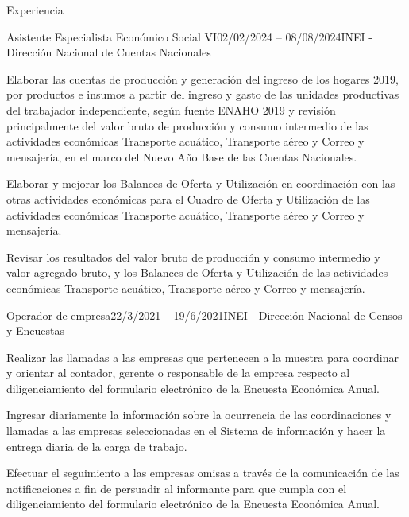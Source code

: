 \documentclass[
11pt, %
]{resume} %
\begin{document}
\begin{rSection}{Experiencia}
		\begin{rSubsection}{Asistente Especialista Económico Social VI}{02/02/2024 – 08/08/2024}{INEI - Dirección Nacional de Cuentas Nacionales}{}
			
			\item Elaborar las cuentas de producción y generación del ingreso de los hogares 2019, por productos e insumos a partir del ingreso y gasto de las unidades productivas del trabajador independiente, según fuente ENAHO 2019 y revisión principalmente del valor bruto de producción y consumo intermedio de las actividades económicas Transporte acuático, Transporte aéreo y Correo y mensajería, en el marco del Nuevo Año Base de las Cuentas Nacionales.
			\item Elaborar y mejorar los Balances de Oferta y Utilización en coordinación con las otras actividades económicas para el Cuadro de Oferta y Utilización de las actividades económicas Transporte acuático, Transporte aéreo y Correo y mensajería. 
			\item Revisar los resultados del valor bruto de producción y consumo intermedio y valor agregado bruto, y los Balances de Oferta y Utilización de las actividades económicas Transporte acuático, Transporte aéreo y Correo y mensajería. 
			
		\end{rSubsection}
		
		
		\begin{rSubsection}{Operador de empresa}{22/3/2021 – 19/6/2021}{INEI - Dirección Nacional de Censos y Encuestas}{}
			\item Realizar las llamadas a las empresas que pertenecen a la muestra para coordinar y orientar al contador, gerente o responsable de la empresa respecto al diligenciamiento del formulario electrónico de la Encuesta Económica Anual.
			\item Ingresar diariamente la información sobre la ocurrencia de las coordinaciones y llamadas a las empresas seleccionadas en el Sistema de información y hacer la entrega diaria de la carga de trabajo.
			\item Efectuar el seguimiento a las empresas omisas a través de la comunicación de las notificaciones a fin de persuadir al informante para que cumpla con el diligenciamiento del formulario electrónico de la Encuesta Económica Anual.
		\end{rSubsection}
		
		

\end{rSection}
\end{document}
